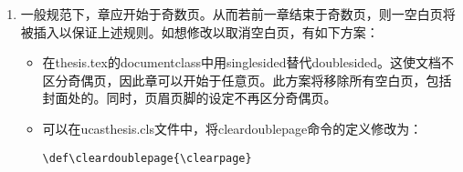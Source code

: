 \begin{enumerate}
                \begin{itemize}
                    \item Linux 和 Windows： 在Thesis.tex中设置

                        {
                            \small
                            \verb|\documentclass[doublesided,fontset=fandol]{Style/ucasthesis}%|
                         }

                         通过显示调用 \href{https://ctan.org/tex-archive/fonts/fandol?lang=en}{fandol} 这一完备的字体库，即可正常显示粗体。\LaTeX{}编译系统一般已携带或是能自动下载安装 \href{https://ctan.org/tex-archive/fonts/fandol?lang=en}{fandol} 字库。若不能，则请手动下载并安装链接所提供的所有字体即可。

                     \item MacOS: 虽然也可以安装和调用fandol字库，但更好的是直接调用系统带有的完备的中文字库： 在artratex.sty的

                         \verb|\RequirePackage{fontspec}|

                        行下添加如下中文字体调用命令：
                        {
                            \scriptsize
\begin{verbatim}
\setCJKmainfont[BoldFont=Songti SC Bold,ItalicFont=Kaiti SC]{Songti SC Light}%
\setCJKsansfont{Heiti SC}%
\setCJKfamilyfont{zhsong}{Songti SC Light}%
\setCJKfamilyfont{zhhei}{Heiti SC}%
\setCJKfamilyfont{zhkai}{Kaiti SC}%
\end{verbatim}
                        }
                \end{itemize}

                因为模版的设定考虑兼顾不同操作系统(Windows, Linux, Mac OS)并兼顾pdflatex和xelatex，为了模版的健壮性，上述字体设置和调用方案并未作为原始设定。
    \item  一般规范下，章应开始于奇数页。从而若前一章结束于奇数页，则一空白页将被插入以保证上述规则。如想修改以取消空白页，有如下方案：
     \begin{itemize}
         \item 在thesis.tex的documentclass中用singlesided替代doublesided。这使文档不区分奇偶页，因此章可以开始于任意页。此方案将移除所有空白页，包括封面处的。同时，页眉页脚的设定不再区分奇偶页。
         \item 可以在ucasthesis.cls文件中，将cleardoublepage命令的定义修改为：

             \verb|\def\cleardoublepage{\clearpage}|


\end{itemize}
\end{enumerate}
